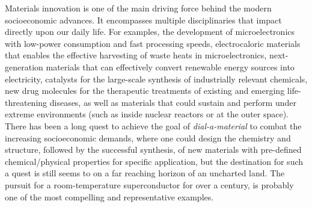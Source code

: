 Materials innovation is one of the main driving force behind the modern socioeconomic advances. It encompasses multiple disciplinaries that impact directly upon our daily life. For examples, the development of microelectronics with low-power consumption and fast processing speeds,\cite{lin2019two} electrocaloric materials\cite{valant2012electrocaloric} that enables the effective harvesting of waste heats in microelectronics, next-generation materials that can effectively convert renewable energy sources into electricity,\cite{zhang2022renewed,han2022ferroelectric} catalysts for the large-scale synthesis of industrially relevant chemicals,\cite{chang2021emerging} new drug molecules for the therapeutic treatments of existing and emerging life-threatening diseases,\cite{tanoli2025computational} as well as materials that could sustain and perform under extreme environments (such as inside nuclear reactors or at the outer space).\cite{mondal2021thermal,tadjer2022toward} There has been a long quest to achieve the goal of \emph{dial-a-material} to combat the increasing socioeconomic demands, where one could design the chemistry and structure, followed by the successful synthesis, of new materials with pre-defined chemical/physical properties for specific application, but the  destination for such a quest is still seems to on a far reaching horizon of an uncharted land. The pursuit for a room-temperature superconductor for over a century,\cite{pickett2023colloquium} is probably one of the most compelling and representative examples.  

